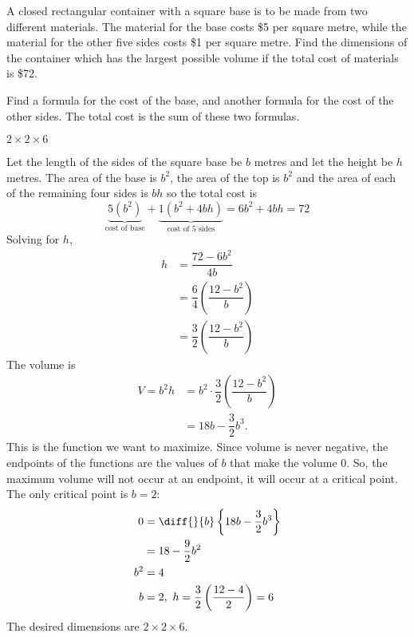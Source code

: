 \begin{Mquestion}[1996D]
A closed rectangular container with a square base is to be made
from two different materials. The material for the base costs \$5 per square
metre, while the material for the other five sides costs \$1 per square
metre. Find the dimensions of the container which has the largest possible
volume if the total cost of materials is \$72.
\end{Mquestion}
\begin{hint} Find a formula for the cost of the base, and another formula for the cost of the other sides. The total cost is the sum of these two formulas.
\end{hint}
\begin{answer}
$2\times 2\times 6$
\end{answer}
\begin{solution}
Let the length of the sides of the square base be $b$ metres
and let the height be $h$ metres. The area of the base is $b^2$, the area
of the top is $b^2$  and the
area of each of the remaining four sides is $bh$ so the total cost is
\[
\underbrace{5(b^2)}_{\mbox{cost of base}}+\underbrace{1(b^2+4bh)}_{\mbox{cost of 5 sides}}=6b^2+4bh=72\]
{Solving for $h$,}
\begin{align*}
h&=\dfrac{72-6b^2}{4b}\\
&=\dfrac{6}{4}\left(\dfrac{12-b^2}{b}\right)\\
&=\dfrac{3}{2}\left(\dfrac{12-b^2}{b}\right)
\end{align*}
The volume is
\begin{align*}
V=b^2h&=b^2\cdot \dfrac{3}{2}\left(\dfrac{12-b^2}{b}\right)
\\
&=18b-\dfrac{3}{2}b^3.
\end{align*}
This is the function we want to maximize.
Since volume is never negative, the endpoints of the functions are the values of $b$ that make the volume 0. So, the maximum volume will not occur at an endpoint, it will occur at a critical point.
The only critical point is $b=2$:
\begin{align*}
0&=\diff{}{b}\left\{18b-\dfrac{3}{2}b^3\right\}\\
&=18-\dfrac{9}{2}b^2\\
 b^2&=4\\
  b&=2,\ h=\dfrac{3}{2}\left(\dfrac{12-4}{2}\right)=6
\end{align*}
The desired dimensions are $2\times 2\times 6$.
\end{solution}



